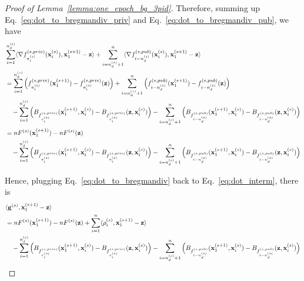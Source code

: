 \begin{proof}[Proof of Lemma~\ref{lemma:one_epoch_bg_3pid}]
    Therefore, summing up Eq.~\ref{eq:dot_to_bregmandiv_priv} and Eq.~\ref{eq:dot_to_bregmandiv_pub}, we have
    \begin{align}
        &\sum_{i=1}^{n_d^{(s)}} \langle \nabla f_{\pi_i^{(s)}}^{(s, priv)}({\mathbf{x}}_i^{(s)}), {\mathbf{x}}_1^{(s+1)} - {\mathbf{z}}\rangle
        + \sum_{i=n_d^{(s)}+1}^{n} \langle \nabla
        f_{i-n_d^{(s)}}^{(s, pub)}({\mathbf{x}}_i^{(s)}),
        {\mathbf{x}}_1^{(s+1)} - {\mathbf{z}}\rangle\\
        \nonumber
        &= \sum_{i=1}^{n_d^{(s)}}\Big(f_{\pi_i^{(s)}}^{(s, priv)}({\mathbf{x}}_1^{(s+1)}) - f_{\pi_i^{(s)}}^{(s, priv)}({\mathbf{z}})\Big)
        + \sum_{i=n_d^{(s)}+1}^{n}\Big(
            f_{i-n_d^{(s)}}^{(s, pub)}({\mathbf{x}}_1^{(s+1)})
            - f_{i-n_d^{(s)}}^{(s, pub)}({\mathbf{z}})
        \Big)\\
        \nonumber
        &\quad - \sum_{i=1}^{n_d^{(s)}}\Big(
            B_{f_{\pi_i^{(s)}}^{(s, priv)}}({\mathbf{x}}_1^{(s+1)}, {\mathbf{x}}_i^{(s)}) - B_{f_{\pi_i^{(s)}}^{(s, priv)}}({\mathbf{z}}, {\mathbf{x}}_i^{(s)})
        \Big)
        - \sum_{i=n_d^{(s)}+1}^{n}\Big(
            B_{f_{i-n_d^{(s)}}^{(s, pub)}}({\mathbf{x}}_1^{(s+1)}, {\mathbf{x}}_i^{(s)})
            - B_{f_{i-n_d^{(s)}}^{(s, pub)}}({\mathbf{z}}, {\mathbf{x}}_i^{(s)})
        \Big)\\
    \label{eq:dot_to_bregmandiv}
        &= n F^{(s)}({\mathbf{x}}_1^{(s+1)}) - n F^{(s)}({\mathbf{z}})\\
        \nonumber
        &\quad - \sum_{i=1}^{n_d^{(s)}}\Big(
            B_{f_{\pi_i^{(s)}}^{(s, priv)}}({\mathbf{x}}_1^{(s+1)}, {\mathbf{x}}_i^{(s)}) - B_{f_{\pi_i^{(s)}}^{(s, priv)}}({\mathbf{z}}, {\mathbf{x}}_i^{(s)})
        \Big)
        - \sum_{i=n_d^{(s)}+1}^{n}\Big(
            B_{f_{i-n_d^{(s)}}^{(s, pub)}}({\mathbf{x}}_1^{(s+1)}, {\mathbf{x}}_i^{(s)})
            - B_{f_{i-n_d^{(s)}}^{(s, pub)}}({\mathbf{z}}, {\mathbf{x}}_i^{(s)})
        \Big)
    \end{align}

    Hence, plugging Eq.~\ref{eq:dot_to_bregmandiv} back to Eq.~\ref{eq:dot_interm}, there is
    \begin{align}
    \label{eq:dot_form_2}
        &\langle {\mathbf{g}}^{(s)}, {\mathbf{x}}_1^{(s+1)} - {\mathbf{z}}\rangle\\
        \nonumber
        &= n F^{(s)}({\mathbf{x}}_1^{(s+1)}) - n F^{(s)}({\mathbf{z}})
        + \sum_{i=1}^{n}\langle \rho_i^{(s)}, {\mathbf{x}}_1^{(s+1)} - {\mathbf{z}}\rangle\\
        \nonumber
        &\quad - \sum_{i=1}^{n_d^{(s)}}\Big(
            B_{f_{\pi_i^{(s)}}^{(s, priv)}}({\mathbf{x}}_1^{(s+1)}, {\mathbf{x}}_i^{(s)}) - B_{f_{\pi_i^{(s)}}^{(s, priv)}}({\mathbf{z}}, {\mathbf{x}}_i^{(s)})
        \Big)
        - \sum_{i=n_d^{(s)}+1}^{n}\Big(
            B_{f_{i-n_d^{(s)}}^{(s, pub)}}({\mathbf{x}}_1^{(s+1)}, {\mathbf{x}}_i^{(s)})
            - B_{f_{i-n_d^{(s)}}^{(s, pub)}}({\mathbf{z}}, {\mathbf{x}}_i^{(s)})
        \Big)
    \end{align}


\end{proof}
